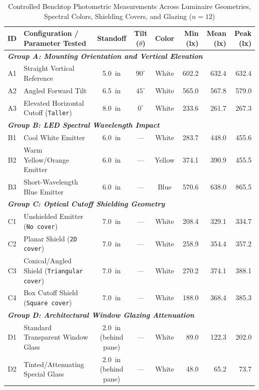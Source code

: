 \documentclass[11pt,a4paper]{article}
\begin{document}
\begin{table}[tbp]
\centering
\caption{Controlled Benchtop Photometric Measurements Across Luminaire Geometries, Spectral Colors, Shielding Covers, and Glazing (\(n = 12\))}
\label{tab:benchtop_results}
\small
\setlength{\tabcolsep}{3.5pt}
\begin{tabularx}{\textwidth}{c >{\raggedright\arraybackslash}X c c c r r r}
\toprule
\textbf{ID} & \textbf{Configuration / Parameter Tested} & \textbf{Standoff} & \textbf{Tilt (\(\theta\))} & \textbf{Color} & \textbf{Min (lx)} & \textbf{Mean (lx)} & \textbf{Peak (lx)} \\
\midrule
\multicolumn{8}{l}{\textit{\textbf{Group A: Mounting Orientation and Vertical Elevation}}} \\
A1 & Straight Vertical Reference & 5.0~in & \(90^\circ\) & White & 602.2 & 632.4 & 632.4 \\
A2 & Angled Forward Tilt & 6.5~in & \(45^\circ\) & White & 565.0 & 567.8 & 579.0 \\
A3 & Elevated Horizontal Cutoff (\texttt{Taller}) & 8.0~in & \(0^\circ\) & White & 233.6 & 261.7 & 267.3 \\
\midrule
\multicolumn{8}{l}{\textit{\textbf{Group B: LED Spectral Wavelength Impact}}} \\
B1 & Cool White Emitter & 6.0~in & --- & White & 283.7 & 448.0 & 455.6 \\
B2 & Warm Yellow/Orange Emitter & 6.0~in & --- & Yellow & 374.1 & 390.9 & 455.5 \\
B3 & Short-Wavelength Blue Emitter & 6.0~in & --- & Blue & 570.6 & 638.0 & 865.5 \\
\midrule
\multicolumn{8}{l}{\textit{\textbf{Group C: Optical Cutoff Shielding Geometry}}} \\
C1 & Unshielded Emitter (\texttt{No cover}) & 7.0~in & --- & White & 208.4 & 329.1 & 334.7 \\
C2 & Planar Shield (\texttt{2D cover}) & 7.0~in & --- & White & 258.9 & 354.4 & 357.2 \\
C3 & Conical/Angled Shield (\texttt{Triangular cover}) & 7.0~in & --- & White & 270.2 & 374.1 & 388.1 \\
C4 & Box Cutoff Shield (\texttt{Square cover}) & 7.0~in & --- & White & 188.0 & 368.4 & 385.3 \\
\midrule
\multicolumn{8}{l}{\textit{\textbf{Group D: Architectural Window Glazing Attenuation}}} \\
D1 & Standard Transparent Window Glass & \makecell{2.0~in \\ (behind pane)} & --- & White & 89.0 & 122.3 & 202.0 \\
D2 & Tinted/Attenuating Special Glass & \makecell{2.0~in \\ (behind pane)} & --- & White & 48.0 & 65.2 & 73.7 \\
\bottomrule
\end{tabularx}
\end{table}
\end{document}
